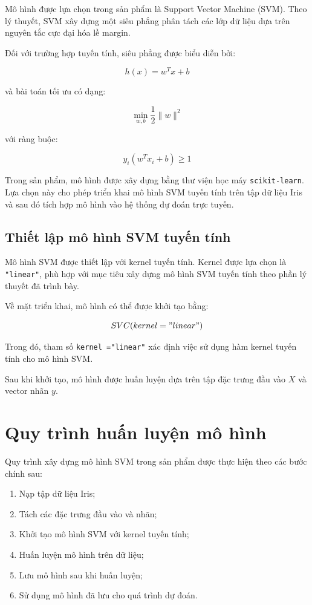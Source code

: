 \documentclass[12pt,a4paper]{report}
\begin{document}
		Mô hình được lựa chọn trong sản phẩm là Support Vector Machine (SVM). Theo lý thuyết, SVM xây dựng một siêu phẳng phân tách các lớp dữ liệu dựa trên nguyên tắc cực đại hóa lề margin.
		
		\noindent
		Đối với trường hợp tuyến tính, siêu phẳng được biểu diễn bởi:
		
		$$
		h(x)=w^Tx+b
		$$
		
		và bài toán tối ưu có dạng:
		
		$$
		\min_{w,b}
		\frac{1}{2}\|w\|^2
		$$
		
		với ràng buộc:
		
		$$
		y_i(w^Tx_i+b)\geq1
		$$
		
		Trong sản phẩm, mô hình được xây dựng bằng thư viện học máy
		\texttt{scikit-learn}. Lựa chọn này cho phép triển khai mô hình SVM tuyến tính	trên tập dữ liệu Iris và sau đó tích hợp mô hình vào hệ thống dự đoán trực
		tuyến.
		
		\subsection{Thiết lập mô hình SVM tuyến tính}
		
		Mô hình SVM được thiết lập với kernel tuyến tính. Kernel được lựa chọn là
		\texttt{"linear"}, phù hợp với mục tiêu xây dựng mô hình SVM tuyến tính theo	phần lý thuyết đã trình bày.
		
		\noindent
		Về mặt triển khai, mô hình có thể được khởi tạo bằng:
		
\[
	SVC(kernel="linear")
\]
		
		Trong đó, tham số \texttt{kernel ="linear"} xác định việc sử dụng hàm kernel tuyến tính cho mô hình SVM.
		
		Sau khi khởi tạo, mô hình được huấn luyện dựa trên tập đặc trưng đầu vào $X$
		và vector nhãn $y$.
		
		\section{Quy trình huấn luyện mô hình}
		
		Quy trình xây dựng mô hình SVM trong sản phẩm được thực hiện theo các bước chính sau:
		
		\begin{enumerate}
			\item Nạp tập dữ liệu Iris;
			\item Tách các đặc trưng đầu vào và nhãn;
			\item Khởi tạo mô hình SVM với kernel tuyến tính;
			\item Huấn luyện mô hình trên dữ liệu;
			\item Lưu mô hình sau khi huấn luyện;
			\item Sử dụng mô hình đã lưu cho quá trình dự đoán.
		\end{enumerate}
		
\end{document}

